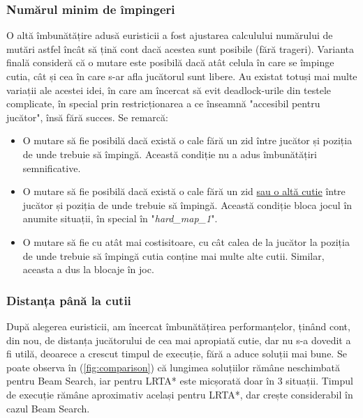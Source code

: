 \documentclass{article}
\begin{document}
\subsubsection{Numărul minim de împingeri}
O altă îmbunătățire adusă euristicii a fost ajustarea calculului numărului de 
mutări astfel încât să țină cont dacă acestea sunt posibile (fără trageri).
Varianta finală consideră că o mutare este posibilă dacă atât celula în care se
împinge cutia, cât și cea în care s-ar afla jucătorul sunt libere. Au existat
totuși mai multe variații ale acestei idei, în care am încercat să evit 
deadlock-urile din testele complicate, în special prin restricționarea a ce 
înseamnă "accesibil pentru jucător", însă fără succes. Se remarcă:
\begin{itemize}
    \item O mutare să fie posibilă dacă există o cale fără un zid între jucător
    și poziția de unde trebuie să împingă. Această condiție nu a adus 
    îmbunătățiri semnificative.
    \item O mutare să fie posibilă dacă există o cale fără un zid 
    \underline{sau o altă cutie} între jucător și poziția de unde trebuie să 
    împingă. Această condiție bloca jocul în anumite situații, în special
    în "\textit{hard\_map\_1}".
    \item O mutare să fie cu atât mai costisitoare, cu cât calea de la jucător 
    la poziția de unde trebuie să împingă cutia conține mai multe alte cutii. 
    Similar, aceasta a dus la blocaje în joc.
\end{itemize}

\subsubsection{Distanța până la cutii}
După alegerea euristicii, am încercat îmbunătățirea performanțelor, ținând 
cont, din nou, de distanța jucătorului de cea mai apropiată cutie, dar nu s-a 
dovedit a fi utilă, deoarece a crescut timpul de execuție, fără a aduce soluții
mai bune. Se poate observa în (\ref{fig:comparison}) că lungimea soluțiilor 
rămâne neschimbată pentru Beam Search, iar pentru LRTA* este micșorată doar în 3
situații. Timpul de execuție rămâne aproximativ același pentru LRTA*, dar crește
considerabil în cazul Beam Search.
\end{document}
